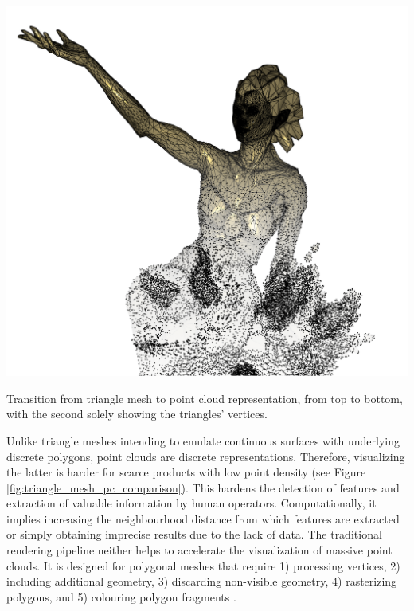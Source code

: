 \begin{marginfigure}[-3.0cm]
	\includegraphics{figs/fundamentals/triangle_mesh_point_cloud.png}
	\caption{Transition from triangle mesh to point cloud representation, from top to bottom, with the second solely showing the triangles' vertices.}
	\label{fig:triangle_mesh_pc_comparison}
\end{marginfigure}
Unlike triangle meshes intending to emulate continuous surfaces with underlying discrete polygons, point clouds are discrete representations. Therefore, visualizing the latter is harder for scarce products with low point density (see Figure \ref{fig:triangle_mesh_pc_comparison}). This hardens the detection of features and extraction of valuable information by human operators. Computationally, it implies increasing the neighbourhood distance from which features are extracted or simply obtaining imprecise results due to the lack of data. The traditional rendering pipeline neither helps to accelerate the visualization of massive point clouds. It is designed for polygonal meshes that require 1) processing vertices, 2) including additional geometry, 3) discarding non-visible geometry, 4) rasterizing polygons, and 5) colouring polygon fragments \cite{akenine-moller_real-time_2018}.


